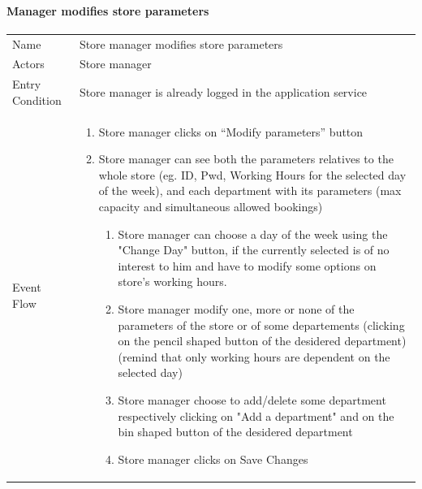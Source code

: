 \documentclass{article}
\newcommand\xrowht[2][0]
{\addstackgap[.5\dimexpr#2\relax]{\vphantom{#1}}}
\begin{document}
			\paragraph{Manager modifies store parameters}
			
				\begin{center}
					
					
					\begin{adjustwidth}{-2.8cm}{}
					\begin{tabular}[h!]{|m{7.5em}|m{36em}|}
						
						\hline
						\xrowht{5pt}
						Name & Store manager modifies store parameters\\
						\xrowht{5pt}
						Actors & Store manager\\
						\xrowht{5pt}
						Entry Condition & Store manager is already logged in the application service\\
						\xrowht{5pt}
						Event Flow & \begin{enumerate}
							
							\itemsep-0.25em
							\item Store manager clicks on “Modify parameters” button
							\item Store manager can see both the parameters relatives to the whole store (eg. ID, Pwd, Working Hours for the selected day of the week), and each department with its parameters (max capacity and simultaneous allowed bookings)
							
							\begin{enumerate}
								
								\itemsep0em
								\item Store manager can choose a day of the week using the "Change Day" button, if the currently selected is of no interest to him and have to modify some options on store's working hours.
								\item Store manager modify one, more or none of the parameters of the store or of some departements (clicking on the pencil shaped button of the desidered department) (remind that only working hours are dependent on the selected day)
								\item Store manager choose to add/delete some department respectively clicking on "Add a department" and on the bin shaped button of the desidered department
								\item Store manager clicks on Save Changes
					

\end{enumerate}
\end{enumerate}
\end{tabular}
\end{adjustwidth}
\end{center}
\end{document}
